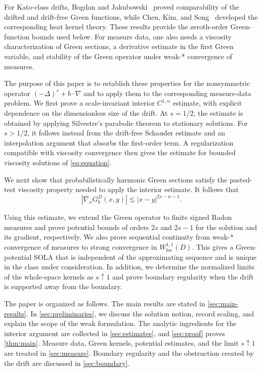 \documentclass[reqno]{amsart}
\numberwithin{equation}{section}
\theoremstyle{plain}
\theoremstyle{definition}
\theoremstyle{remark}
\begin{document}
For Kato-class drifts, Bogdan and Jakubowski~\cite{BogdanJakubowski2012}
proved comparability of the drifted and drift-free Green functions, while
Chen, Kim, and Song~\cite{ChenKimSong2012} developed the corresponding heat
kernel theory.  These results provide the zeroth-order Green-function bounds
used below.  For measure data, one also needs a viscosity characterization of
Green sections, a derivative estimate in the first Green variable, and
stability of the Green operator under weak-* convergence of measures.

The purpose of this paper is to establish these properties for the
nonsymmetric operator $(-\Delta)^s+b\cdot\nabla$ and to apply them to the
corresponding measure-data problem.  We first prove a scale-invariant interior
$C^{1,\alpha}$ estimate, with explicit dependence on the dimensionless size of
the drift.  At $s=1/2$, the estimate is obtained by applying Silvestre's
parabolic theorem to stationary solutions.  For $s>1/2$, it follows instead
from the drift-free Schauder estimate and an interpolation argument that
absorbs the first-order term.  A regularization compatible with viscosity
convergence then gives the estimate for bounded viscosity solutions of
\eqref{eq:equation}.

We next show that probabilistically harmonic Green sections satisfy the
pasted-test viscosity property needed to apply the interior estimate.  It
follows that
\[
 |\nabla_xG_b^D(x,y)|\lesssim |x-y|^{2s-n-1}.
\]

Using this estimate, we extend the Green operator to finite signed Radon
measures and prove potential bounds of orders $2s$ and $2s-1$ for the solution
and its gradient, respectively.  We also prove sequential continuity from
weak-* convergence of measures to strong convergence in
$W^{1,1}_{\mathrm{loc}}(D)$.  This gives a Green-potential SOLA that is
independent of the approximating sequence and is unique in the class under
consideration.  In addition, we determine the normalized limits of the
whole-space kernels as $s\uparrow1$ and prove boundary regularity when the
drift is supported away from the boundary.

The paper is organized as follows.  The main results are stated in
\cref{sec:main-results}.  In \cref{sec:preliminaries}, we discuss the
solution notion, record scaling, and explain the scope of the weak
formulation.  The analytic ingredients for the interior argument are collected
in \cref{sec:estimates}, and \cref{sec:proof} proves
\cref{thm:main}.  Measure data, Green kernels, potential estimates, and the
limit $s\uparrow1$ are treated in \cref{sec:measure}.  Boundary regularity
and the obstruction created by the drift are discussed in
\cref{sec:boundary}.
\end{document}
